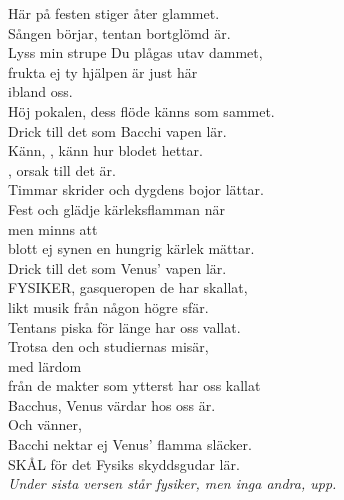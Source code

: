 \documentclass[a6paper, 10pt, twoside]{article}
\begin{document}
\noindent
{}
\small
\begin{center}
\end{center}
\begin{lyrics}
Här på festen stiger åter glammet.\\
Sången börjar, tentan bortglömd är.\\
Lyss min strupe Du plågas utav dammet,\\
frukta ej ty hjälpen är just här\\
ibland oss.\\
Höj pokalen, dess flöde känns som sammet.\\
Drick till det som Bacchi vapen lär.
\vspace{5pt}\\
Känn, , känn hur blodet hettar.\\
, orsak till det är.\\
Timmar skrider och dygdens bojor lättar.\\
Fest och glädje kärleksflamman när\\
men minns att\\
blott ej synen en hungrig kärlek mättar.\\
Drick till det som Venus' vapen lär.
\vspace{5pt}\\
FYSIKER, gasqueropen de har skallat,\\
likt musik från någon högre sfär.\\
Tentans piska för länge har oss vallat.\\
Trotsa den och studiernas misär,\\
med lärdom\\
från de makter som ytterst har oss kallat\\
Bacchus, Venus värdar hos oss är.\\
Och vänner,\\
Bacchi nektar ej Venus' flamma släcker. \\
SKÅL för det Fysiks skyddsgudar lär. 
\vspace{5pt}\\
\textit{Under sista versen står fysiker, men inga andra, upp. }\\
\end{lyrics}
\end{document}
